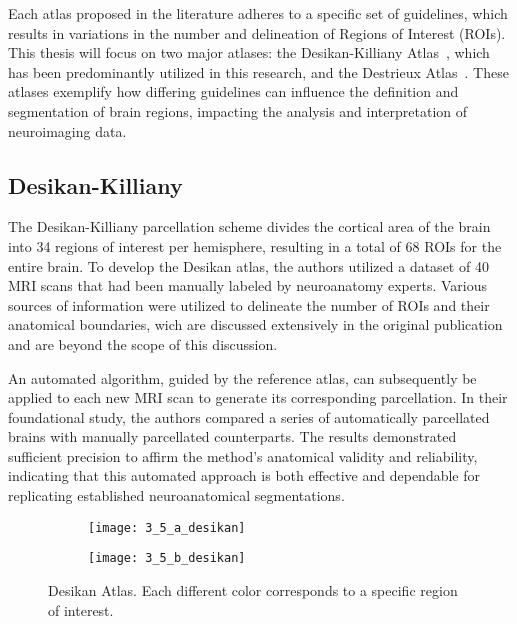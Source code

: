 Each atlas proposed in the literature adheres to a specific set of guidelines,
which results in variations in the number and delineation of Regions of Interest
(ROIs). This thesis will focus on two major atlases: the Desikan-Killiany
Atlas~\cite{desikan_automated_2006}, which has been predominantly utilized in
this research, and the Destrieux Atlas~.
These atlases exemplify how differing guidelines can influence the definition
and segmentation of brain regions, impacting the analysis and interpretation of
neuroimaging data.

\subsection{Desikan-Killiany}
The Desikan-Killiany parcellation scheme divides the cortical area of the brain
into 34 regions of interest per hemisphere, resulting in a total of 68 ROIs for
the entire brain. To develop the Desikan atlas, the authors utilized a dataset
of 40 MRI scans that had been manually labeled by neuroanatomy experts. Various
sources of information were utilized to delineate the number of ROIs and their
anatomical boundaries, wich are discussed extensively in the original
publication~\cite{desikan_automated_2006} and are beyond the scope of this
discussion.

An automated algorithm, guided by the reference atlas, can
subsequently be applied to each new MRI scan to generate its corresponding
parcellation. In their foundational study, the authors compared a series of
automatically parcellated brains with manually parcellated counterparts. The
results demonstrated sufficient precision to affirm the method's anatomical
validity and reliability, indicating that this automated approach is both
effective and dependable for replicating established neuroanatomical
segmentations.

\begin{figure}
    \begin{subfigure}[h]{.5\linewidth}
        \texttt{[image: 3\_5\_a\_desikan]}
    \end{subfigure}%
    \begin{subfigure}[h]{0.5\linewidth}
        \texttt{[image: 3\_5\_b\_desikan]}
    \end{subfigure}
    \caption[Desikan Atlas]{Desikan Atlas. Each different color corresponds to a
    specific region of interest.}
\end{figure}

